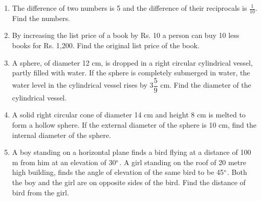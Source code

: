 \documentclass[journal,12pt,twocolumn]{IEEEtran}
\begin{document}
\begin{enumerate}
 \item The difference of two numbers is 5 and the difference of their reciprocals is $\displaystyle\frac{1}{10}$. Find the numbers.
 
\item  By increasing the list price of a book by Rs. 10 a person can buy 10 less books for Rs. 1,200. Find the original list price of the book.

\item A sphere, of diameter 12 cm, is dropped in a right circular cylindrical vessel, partly filled with water. If the sphere is completely submerged in water, the water level in the cylindrical vessel rises by {3}$\dfrac{5}{9}$ cm. Find the diameter of the cylindrical vessel.

\item A solid right circular cone of diameter 14 cm and height 8 cm is melted to form a hollow sphere. If the external diameter of the sphere is 10 cm, find the internal diameter of the sphere.

\item A boy standing on a horizontal plane finds a bird flying at a distance of 100 m from him at an elevation of 30$\degree$. A girl standing on the roof of 20 metre high building, finds the angle of elevation of the same bird to be 45$\degree$. Both the boy and the girl are on opposite sides of the bird. Find the distance of bird from the girl.


\end{enumerate}
\end{document}
